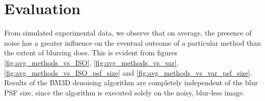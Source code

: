 \documentclass[12pt,notitlepage]{report}
\begin{document}
\clearpage


\section{Evaluation}
\label{sec:evaluation}

From simulated experimental data, we observe that on average, the presence of noise has a greater influence on the eventual outcome of a particular method than the extent of blurring does. This is evident from figures \ref{fig:avg_methods_vs_ISO}, \ref{fig:avg_methods_vs_var}, \ref{fig:avg_methods_vs_ISO_psf_size} and \ref{fig:avg_methods_vs_var_psf_size}. Results of the BM3D denoising algorithm are completely independent of the blur PSF size, since the algorithm is executed solely on the noisy, blur-less image.

\begin{figure}[h]
  \centering


\end{figure}
\end{document}
